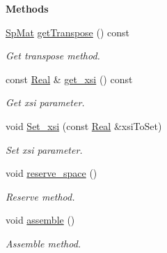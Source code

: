 \begin{Indent}{\bf Methods}\par
\begin{DoxyCompactItemize}
\item 
\hyperlink{namespaceFVCode3D_ac1032289d96638cf0ad6c52ef639095f}{Sp\+Mat} \hyperlink{classFVCode3D_1_1CouplingConditions_a1b13165b7ce7a8908427690a0d1e47ee}{get\+Transpose} () const 
\begin{DoxyCompactList}\small\item\em Get transpose method. \end{DoxyCompactList}\item 
const \hyperlink{namespaceFVCode3D_a40c1f5588a248569d80aa5f867080e83}{Real} \& \hyperlink{classFVCode3D_1_1CouplingConditions_ac7c68a7baf111eb385ed4028245074a8}{get\+\_\+xsi} () const 
\begin{DoxyCompactList}\small\item\em Get xsi parameter. \end{DoxyCompactList}\item 
void \hyperlink{classFVCode3D_1_1CouplingConditions_aae796c113f61442f57f7844cd2174b9c}{Set\+\_\+xsi} (const \hyperlink{namespaceFVCode3D_a40c1f5588a248569d80aa5f867080e83}{Real} \&xsi\+To\+Set)
\begin{DoxyCompactList}\small\item\em Set xsi parameter. \end{DoxyCompactList}\item 
void \hyperlink{classFVCode3D_1_1CouplingConditions_ae32eaf7920f8c314a010993d4a7c821d}{reserve\+\_\+space} ()
\begin{DoxyCompactList}\small\item\em Reserve method. \end{DoxyCompactList}\item 
void \hyperlink{classFVCode3D_1_1CouplingConditions_abc5162d3d50fd44aac557f0a21aa4d3c}{assemble} ()
\begin{DoxyCompactList}\small\item\em Assemble method. \end{DoxyCompactList}\end{DoxyCompactItemize}
\end{Indent}
